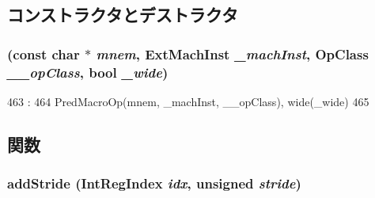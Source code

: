 \subsection{コンストラクタとデストラクタ}
\hypertarget{classArmISA_1_1VfpMacroOp_ad1ea467a0c112f63d8149e20c8cc1389}{
\subsubsection[{VfpMacroOp}]{ (const char $\ast$ {\em mnem}, \/  {\bf ExtMachInst} {\em \_\-machInst}, \/  OpClass {\em \_\-\_\-opClass}, \/  bool {\em \_\-wide})}}
\label{classArmISA_1_1VfpMacroOp_ad1ea467a0c112f63d8149e20c8cc1389}



\begin{DoxyCode}
463                                            :
464         PredMacroOp(mnem, _machInst, __opClass), wide(_wide)
465     {}

\end{DoxyCode}


\subsection{関数}
\hypertarget{classArmISA_1_1VfpMacroOp_aad8d1dafc419f6554255546d0a4c11b9}{
\subsubsection[{addStride}]{ addStride ({\bf IntRegIndex} {\em idx}, \/  unsigned {\em stride})}}
\label{classArmISA_1_1VfpMacroOp_aad8d1dafc419f6554255546d0a4c11b9}



